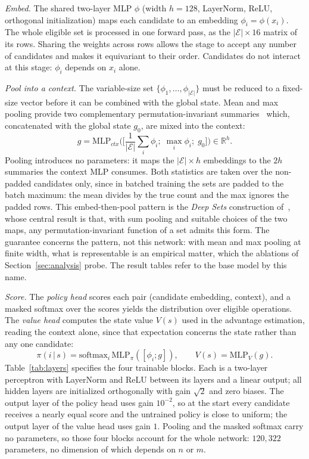 \documentclass[preprint,12pt]{elsarticle}
\theoremstyle{definition}
\theoremstyle{remark}
\begin{document}
\emph{Embed.} The shared two-layer MLP $\phi$ (width $h{=}128$,
LayerNorm, ReLU, orthogonal initialization) maps each candidate to an
embedding $\phi_i=\phi(x_i)$. The whole eligible set is processed in
one forward pass, as the $|\mathcal{E}|\times16$ matrix of its rows.
Sharing the weights across rows allows the stage to accept any number
of candidates and makes it equivariant to their order. Candidates do
not interact at this stage: $\phi_i$ depends on $x_i$ alone.

\emph{Pool into a context.} The variable-size set
$\{\phi_1,\dots,\phi_{|\mathcal{E}|}\}$ must be reduced to a
fixed-size vector before it can be combined with the global state. Mean and max
pooling provide two complementary permutation-invariant
summaries~\citep{Zaheer2017} which, concatenated with the global
state $g_0$, are mixed into the context:
\begin{equation}
g=\mathrm{MLP}_{ctx}\big(\big[\textstyle\frac1{|\mathcal{E}|}\sum_i\phi_i;\;
\max_i\phi_i;\;g_0\big]\big)\in\mathbb{R}^{h}.
\end{equation}
Pooling introduces no parameters: it maps the
$|\mathcal{E}|\times h$ embeddings to the $2h$ summaries the context
MLP consumes. Both statistics are taken over the non-padded
candidates only, since in batched training the sets are padded to the
batch maximum: the mean divides by the true count and the max ignores
the padded rows.
This embed-then-pool pattern is the \emph{Deep Sets} construction
of~\citet{Zaheer2017}, whose central result is that, with sum
pooling and suitable choices of the two maps, any permutation-invariant
function of a set admits this form. The guarantee concerns the
pattern, not this network: with mean and max pooling at finite width,
what is representable is an empirical matter, which the ablations of
Section~\ref{sec:analysis} probe. The result tables
refer to the base model by this name.

\emph{Score.} The \emph{policy head} scores each pair (candidate
embedding, context), and a masked softmax over the scores yields the
distribution over eligible operations. The \emph{value head}
computes the state value $V(s)$ used in the advantage estimation,
reading the context alone, since that expectation concerns the state
rather than any one candidate:
\begin{equation}
\pi(i\,|\,s)=\mathrm{softmax}_i\,\mathrm{MLP}_{\pi}([\phi_i;g]),
\qquad
V(s)=\mathrm{MLP}_{V}(g).
\end{equation}
Table~\ref{tab:layers} specifies the four trainable blocks. Each is a
two-layer perceptron with LayerNorm and ReLU between its layers and a
linear output; all hidden layers are initialized orthogonally with
gain $\sqrt2$ and zero biases. The output layer of the policy head
uses gain $10^{-2}$, so at the start every candidate receives a
nearly equal score and the untrained policy is close to uniform; the
output layer of the value head uses gain $1$. Pooling and the masked
softmax carry no parameters, so those four blocks account for the
whole network: $120{,}322$ parameters, no dimension of which depends
on $n$ or $m$.
\end{document}
